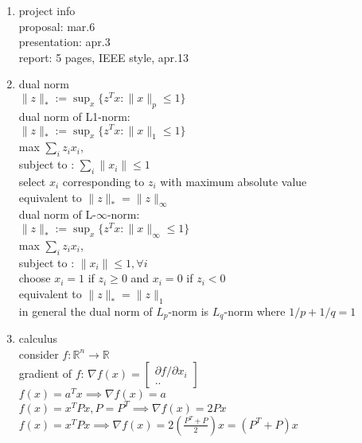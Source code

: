 \documentclass[12pt,letter]{article}
\newcommand{\R}{\mathbb{R}}
\begin{document}

\begin{enumerate}

\item project info\\
  proposal: mar.6\\
  presentation: apr.3\\
  report: 5 pages, IEEE style, apr.13\\
  
\item dual norm\\
  $\|z\|_* := \sup_x \{z^T x : \|x\|_p \leq 1\}$\\
  
  dual norm of L1-norm:\\
  $\|z\|_* := \sup_x \{z^T x : \|x\|_1 \leq 1\}$\\
  max $\sum_i z_i x_i$,\\
  subject to : $\sum_i \|x_i\| \leq 1$\\
  select $x_i$ corresponding to $z_i$ with maximum absolute value\\
  equivalent to $\|z\|_* = \|z\|_{\infty}$\\

  dual norm of L-$\infty$-norm:\\
  $\|z\|_* := \sup_x \{z^T x : \|x\|_{\infty} \leq 1\}$\\
  max $\sum_i z_i x_i$,\\
  subject to : $\|x_i\| \leq 1, \forall i$\\
  choose $x_i=1$ if $z_i \geq 0$ and $x_i=0$ if $z_i < 0$\\
  equivalent to $\|z\|_* = \|z\|_1$\\

  in general the dual norm of $L_p$-norm is $L_q$-norm where $1/p + 1/q = 1$\\

\item calculus\\
  consider $f:\R^n \to \R$\\
  gradient of $f$: $\nabla f(x) = \begin{bmatrix} \partial f / \partial x_i \\ .. \end{bmatrix}$\\
  $f(x) = a^Tx \implies \nabla f(x) = a$\\
  $f(x) = x^TPx, P=P^T \implies \nabla f(x) = 2Px$\\
  $f(x) = x^TPx \implies \nabla f(x) = 2(\frac{P^T+P}{2})x=(P^T+P)x$\\


\end{enumerate}
\end{document}
